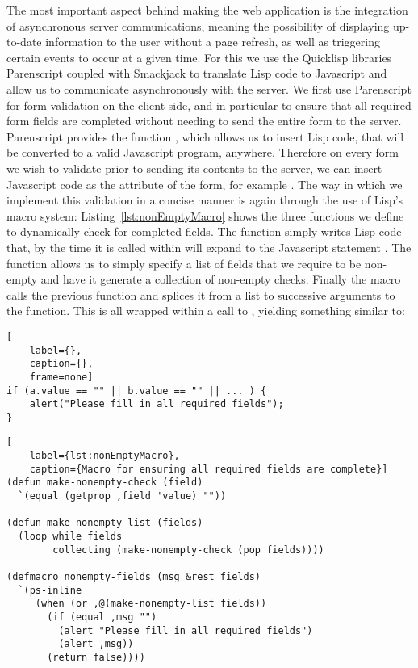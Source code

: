 The most important aspect behind making the web application is the
integration of asynchronous server communications, meaning the possibility of
displaying up-to-date information to the user without a page refresh, as well
as triggering certain events to occur at a given time. For this we use the
Quicklisp libraries Parenscript coupled with Smackjack to translate Lisp code
to Javascript and allow us to communicate asynchronously with the server. We
first use Parenscript for form validation on the client-side, and in particular
to ensure that all required form fields are completed without needing to send
the entire form to the server. Parenscript provides the function
, which allows us to insert Lisp code, that will be converted
to a valid Javascript program, anywhere. Therefore on every form we wish to
validate prior to sending its contents to the server, we can insert Javascript
code as the  attribute of the form, for example . The way in
which we implement this validation in a concise manner is again through the use
of Lisp's macro system: Listing~\ref{lst:nonEmptyMacro} shows the three
functions we define to dynamically check for completed fields. The function
 simply writes Lisp code that, by the time it is
called within  will expand to the Javascript statement
. The function  allows us to
simply specify a list of fields that we require to be non-empty and have it
generate a collection of non-empty checks. Finally the macro
 calls the previous function and splices it from a list
to successive arguments to the  function. This is all wrapped within a
call to , yielding something similar to:

\begin{lstlisting}[
	label={},
	caption={},
	frame=none]
if (a.value == "" || b.value == "" || ... ) {
    alert("Please fill in all required fields");
}
\end{lstlisting}

\begin{lstlisting}[
	label={lst:nonEmptyMacro},
	caption={Macro for ensuring all required fields are complete}]
(defun make-nonempty-check (field)
  `(equal (getprop ,field 'value) ""))

(defun make-nonempty-list (fields)
  (loop while fields
        collecting (make-nonempty-check (pop fields))))

(defmacro nonempty-fields (msg &rest fields)
  `(ps-inline
     (when (or ,@(make-nonempty-list fields))
       (if (equal ,msg "")
         (alert "Please fill in all required fields")
         (alert ,msg))
       (return false))))
\end{lstlisting}

